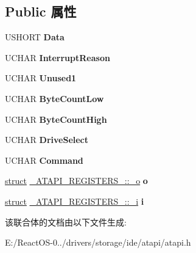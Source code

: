 \subsection*{Public 属性}
\begin{DoxyCompactItemize}
\item 
\mbox{\label{struct___a_t_a_p_i___r_e_g_i_s_t_e_r_s__1_a14ac5d6edf4cb6ffe50a39828f109a5f}} 
U\+S\+H\+O\+RT {\bfseries Data}
\item 
\mbox{\label{struct___a_t_a_p_i___r_e_g_i_s_t_e_r_s__1_a837fd2dce66aa0e81d0fe2cb9117fb55}} 
U\+C\+H\+AR {\bfseries Interrupt\+Reason}
\item 
\mbox{\label{struct___a_t_a_p_i___r_e_g_i_s_t_e_r_s__1_abb2448a545592c871e828d9cb5a951b9}} 
U\+C\+H\+AR {\bfseries Unused1}
\item 
\mbox{\label{struct___a_t_a_p_i___r_e_g_i_s_t_e_r_s__1_a67e18cea82919e014a2d376380d3173e}} 
U\+C\+H\+AR {\bfseries Byte\+Count\+Low}
\item 
\mbox{\label{struct___a_t_a_p_i___r_e_g_i_s_t_e_r_s__1_a97d543aabad82f9c30f1d4ca03eea20b}} 
U\+C\+H\+AR {\bfseries Byte\+Count\+High}
\item 
\mbox{\label{struct___a_t_a_p_i___r_e_g_i_s_t_e_r_s__1_aaeb724e3752f2d50564036f3c5dc2213}} 
U\+C\+H\+AR {\bfseries Drive\+Select}
\item 
\mbox{\label{struct___a_t_a_p_i___r_e_g_i_s_t_e_r_s__1_aac1d97e6b670cc251b891b0d20360c0b}} 
U\+C\+H\+AR {\bfseries Command}
\item 
\mbox{\label{struct___a_t_a_p_i___r_e_g_i_s_t_e_r_s__1_a34b038f9a2f7ce22bac52157c3348081}} 
\hyperlink{interfacestruct}{struct} \hyperlink{struct___a_t_a_p_i___r_e_g_i_s_t_e_r_s__1_1_1__o}{\+\_\+\+A\+T\+A\+P\+I\+\_\+\+R\+E\+G\+I\+S\+T\+E\+R\+S\+\_\+::\+\_\+o} {\bfseries o}
\item 
\mbox{\label{struct___a_t_a_p_i___r_e_g_i_s_t_e_r_s__1_a7a1301cad17f8980f7ab93f86ca4c780}} 
\hyperlink{interfacestruct}{struct} \hyperlink{struct___a_t_a_p_i___r_e_g_i_s_t_e_r_s__1_1_1__i}{\+\_\+\+A\+T\+A\+P\+I\+\_\+\+R\+E\+G\+I\+S\+T\+E\+R\+S\+\_\+::\+\_\+i} {\bfseries i}
\end{DoxyCompactItemize}


该联合体的文档由以下文件生成\+:\begin{DoxyCompactItemize}
\item 
E\+:/\+React\+O\+S-\/0../drivers/storage/ide/atapi/atapi.\+h\end{DoxyCompactItemize}

